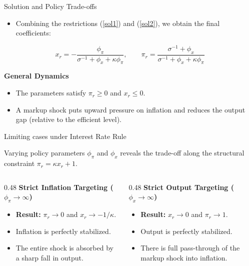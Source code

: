 \documentclass[11pt,aspectratio=169]{beamer}
\begin{document}
\begin{frame}{Solution and Policy Trade-offs}
\small

\begin{itemize}
    \item Combining the restrictions (\ref{sol1}) and (\ref{sol2}), we obtain the final coefficients:
\end{itemize}
\begin{equation*}
x_{r}=-\frac{\phi _{\pi }}{\sigma ^{-1}+\phi _{x}+\kappa \phi _{\pi }}, \qquad
\pi _{r}=\frac{\sigma ^{-1}+\phi _{x}}{\sigma ^{-1}+\phi _{x}+\kappa \phi _{\pi }}
\end{equation*}

\textbf{General Dynamics}
\begin{itemize}
    \item The parameters satisfy $\pi _{r}\geq 0$ and $x_{r}\leq 0$.
    \item A markup shock puts upward pressure on inflation and reduces the output gap (relative to the efficient level).
\end{itemize}
\end{frame}
\begin{frame}{Limiting cases under Interest Rate Rule}
\small

Varying policy parameters $\phi _{\pi }$ and $\phi _{x}$ reveals the trade-off along the structural constraint $\pi _{r}=\kappa x_{r}+1$.

\vspace{0.3cm}

\begin{columns}[t]

\begin{column}{0.48\textwidth}
\textbf{Strict Inflation Targeting ($\phi _{\pi }\rightarrow \infty $)}
\begin{itemize}
\item \textbf{Result:} $\pi _{r} \to 0$ and $x_{r} \to -1/\kappa$.
\item Inflation is perfectly stabilized.
\item The entire shock is absorbed by a sharp fall in output.
\end{itemize}
\end{column}

\begin{column}{0.48\textwidth}
\textbf{Strict Output Targeting ($\phi _{x}\rightarrow \infty $)}
\begin{itemize}
\item \textbf{Result:} $x_{r} \to 0$ and $\pi _{r} \to 1$.
\item Output is perfectly stabilized.
\item There is full pass-through of the markup shock into inflation.
\end{itemize}
\end{column}

\end{columns}

\end{frame}
\end{document}
